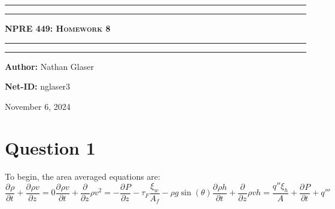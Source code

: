 \documentclass{article}
\begin{document}
\newcommand{\circled}[1]{\tikz[baseline=(char.base)]{
            \node[shape=circle,draw,inner sep=2pt] (char) {#1};}}

\newcommand{\pd}[3]{\frac{\partial^{#3}#1}{\partial {#2}^{#3}}}
\begin{titlepage}

\centering
\scshape
\vspace{\baselineskip}

%
\rule{\textwidth}{1.6pt}\vspace*{-\baselineskip}\vspace*{2pt}
\rule{\textwidth}{0.4pt}

{\Huge \textbf{\textsc{NPRE 449: Homework 8 \\
\vspace{15pt}}}}

\rule{\textwidth}{0.4pt}\vspace*{-\baselineskip}\vspace{3.2pt}
\rule{\textwidth}{1.6pt}\vspace{6pt}
\vspace{1.5\baselineskip}


\large \centerline{\textbf{Author:} Nathan Glaser}
\large \centerline{\textbf{Net-ID:} nglaser3}
\quad

\vfill
\large \centerline{November 6, 2024}
%
\end{titlepage}

\tableofcontents
\newpage
{}

\section{Question 1}
To begin, the area averaged equations are:
\begin{subequations}
    \begin{equation}
        \pd{\rho}{t}{} + \pd{\rho v}{z}{} = 0
        \label{mass}
    \end{equation}
    \begin{equation}
        \pd{\rho v}{t}{} + \pd{}{z}{}\rho v^2 = -\pd{P}{z}{}-\tau_F\frac{\xi_w}{A_f} - \rho g \sin(\theta)
        \label{momentum}
    \end{equation}
    \begin{equation}
        \pd{\rho h}{t}{} + \pd{}{z}{}\rho v h = \frac{q''\xi_h}{A}+\pd{P}{t}{} + q'''
        \label{energy}
    \end{equation}
\end{subequations}
\end{document}
